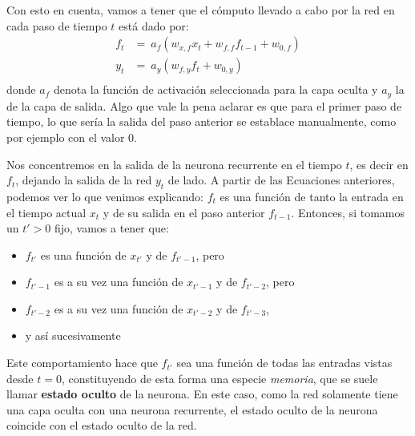 \documentclass[../../main.tex]{subfiles}
\begin{document}
Con esto en cuenta, vamos a tener que el cómputo llevado a cabo por la red
en cada paso de tiempo \(t\) está dado por:
\begin{align*}
    f_t &=\ a_f \left( w_{x,f} x_t  + w_{f,f} f_{t-1} + w_{0,f} \right) \\
    y_t &=\ a_y \left( w_{f,y} f_t + w_{0,y} \right) \\
\end{align*}
donde \(a_f\) denota la función de activación seleccionada para la capa oculta y \(a_y\)
la de la capa de salida. Algo que vale la pena aclarar es que para el primer paso
de tiempo, lo que sería la salida del paso anterior se establace manualmente, como
por ejemplo con el valor 0.

Nos concentremos en la salida de la neurona recurrente en el tiempo \(t\), es decir
en \(f_t\), dejando la salida de la red \(y_t\) de lado. A partir de las Ecuaciones
anteriores, podemos ver lo que venimos explicando: \(f_t\) es una función de
tanto la entrada en el tiempo actual \(x_t\) y de su salida en el paso anterior
\(f_{t-1}\). Entonces, si tomamos un \(t' > 0\) fijo, vamos a tener que:
\begin{itemize}[itemsep=0.05cm]
    \item \(f_{t'}\) es una función de \(x_{t'}\) y de \(f_{t'-1}\), pero
    \item \(f_{t'-1}\) es a su vez una función de \(x_{t'-1}\) y de \(f_{t'-2}\), pero
    \item \(f_{t'-2}\) es a su vez una función de \(x_{t'-2}\) y de \(f_{t'-3}\),
    \item y así sucesivamente
\end{itemize}
Este comportamiento hace que \(f_{t'}\) sea una función de todas las entradas vistas desde
\(t=0\), constituyendo de esta forma una especie \textit{memoria}, que se suele llamar
\textbf{estado oculto} de la neurona. En este caso, como la red solamente tiene una capa
oculta con una neurona recurrente, el estado oculto de la neurona coincide con el estado
oculto de la red.
\end{document}
